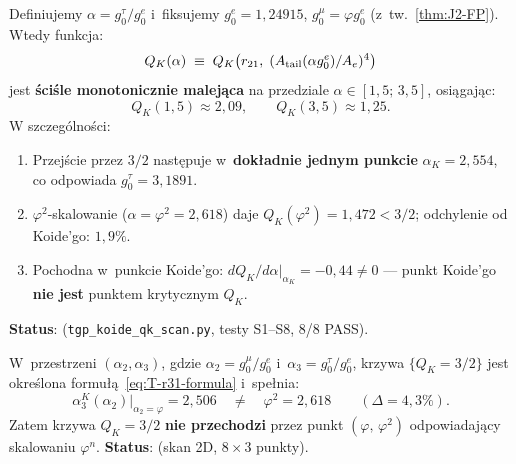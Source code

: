 \begin{proposition}\label{prop:T-QK-topology}
Definiujemy $\alpha = g_0^\tau / g_0^e$ i~fiksujemy
$g_0^e = 1{,}24915$, $g_0^\mu = \varphi g_0^e$ (z~tw.~\ref{thm:J2-FP}).
Wtedy funkcja:
\begin{equation}\label{eq:T-QK-alpha}
  Q_K(\alpha) \;\equiv\;
  Q_K\bigl(r_{21},\; (A_{\rm tail}(\alpha g_0^e)/A_e)^4\bigr)
\end{equation}
jest \textbf{\'sci\'sle monotonicznie malej\k{a}ca} na przedziale
$\alpha \in [1{,}5;\, 3{,}5]$, osi\k{a}gaj\k{a}c:
\begin{equation}\label{eq:T-QK-range}
  Q_K(1{,}5) \approx 2{,}09,
  \qquad
  Q_K(3{,}5) \approx 1{,}25.
\end{equation}
W szczeg\'olno\'sci:
\begin{enumerate}[nosep]
  \item Przej\'scie przez $3/2$ nast\k{e}puje w~\textbf{dok\l{}adnie jednym punkcie}
    $\alpha_K = 2{,}554$, co odpowiada $g_0^\tau = 3{,}1891$.
  \item $\varphi^2$-skalowanie ($\alpha = \varphi^2 = 2{,}618$) daje
    $Q_K(\varphi^2) = 1{,}472 < 3/2$; odchylenie od Koide'go: $1{,}9\%$.
  \item Pochodna w~punkcie Koide'go:
    $dQ_K/d\alpha|_{\alpha_K} = -0{,}44 \neq 0$ ---
    punkt Koide'go \textbf{nie jest} punktem krytycznym $Q_K$.
\end{enumerate}
\textbf{Status}: 
(\texttt{tgp\_koide\_qk\_scan.py}, testy S1--S8, 8/8 PASS).
\end{proposition}

\begin{proposition}[Krzywa $Q_K = 3/2$ w~przestrzeni 2D]%
\label{prop:T-QK-2D}
W~przestrzeni $(\alpha_2, \alpha_3)$, gdzie $\alpha_2 = g_0^\mu/g_0^e$
i~$\alpha_3 = g_0^\tau/g_0^e$, krzywa $\{Q_K = 3/2\}$ jest okre\'slona
formu\l\k{a}~\eqref{eq:T-r31-formula} i~spe\l{}nia:
\begin{equation}\label{eq:T-2D-result}
  \alpha_3^K(\alpha_2)\big|_{\alpha_2 = \varphi}
    = 2{,}506
  \quad \neq \quad \varphi^2 = 2{,}618
  \qquad (\Delta = 4{,}3\%).
\end{equation}
Zatem krzywa $Q_K = 3/2$ \textbf{nie przechodzi}
przez punkt $(\varphi,\, \varphi^2)$ odpowiadaj\k{a}cy
skalowaniu $\varphi^n$.
\textbf{Status}:  (skan 2D, $8 \times 3$ punkty).
\end{proposition}

